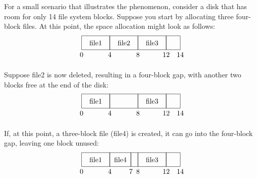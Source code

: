 For a small scenario that illustrates the phenomenon, consider a disk
that has room for only 14 file system blocks.  Suppose you start by
allocating three four-block files.  At this point, the space
allocation might look as follows:
\[\begin{tikzpicture}[scale=.035]
\draw (0,0) rectangle (40,20);
\draw (40,0) rectangle (80,20);
\draw (80,0) rectangle (120,20);
\draw (120,0) rectangle (140,20);
\draw (20,10) node{file1};
\draw (60,10) node{file2};
\draw (100,10) node{file3};
\draw (0,-7) node{0};
\draw (40,-7) node{4};
\draw (80,-7) node{8};
\draw (120,-7) node{12};
\draw (140,-7) node{14};
\end{tikzpicture}\]

Suppose file2 is now deleted, resulting in a four-block gap, with
another two blocks free at the end of the disk:
\[\begin{tikzpicture}[scale=.035]
\draw (0,0) rectangle (40,20);
\draw (40,0) rectangle (80,20);
\draw (80,0) rectangle (120,20);
\draw (120,0) rectangle (140,20);
\draw (20,10) node{file1};
\draw (100,10) node{file3};
\draw (0,-7) node{0};
\draw (40,-7) node{4};
\draw (80,-7) node{8};
\draw (120,-7) node{12};
\draw (140,-7) node{14};
\end{tikzpicture}\]

If, at this point, a three-block file (file4) is created, it can go
into the four-block gap, leaving one block unused:
\[\begin{tikzpicture}[scale=.035]
\draw (0,0) rectangle (40,20);
\draw (40,0) rectangle (70,20);
\draw (70,0) rectangle (80,20);
\draw (80,0) rectangle (120,20);
\draw (120,0) rectangle (140,20);
\draw (20,10) node{file1};
\draw (100,10) node{file3};
\draw (55,10) node{file4};
\draw (0,-7) node{0};
\draw (40,-7) node{4};
\draw (70,-7) node{7};
\draw (80,-7) node{8};
\draw (120,-7) node{12};
\draw (140,-7) node{14};
\end{tikzpicture}\]
